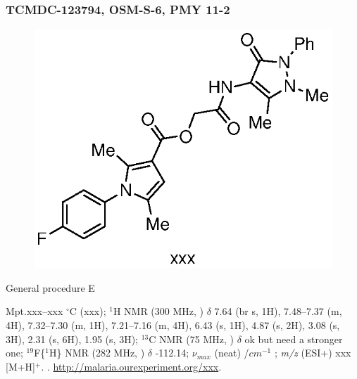\documentclass[12pt, a4paper,titlepage]{article}
\begin{document}
\subsubsection*{TCMDC-123794, OSM-S-6, PMY 11-2}
\label{exp:PMY11}
	\begin{figure}[H]
	\begin{center}
	\includegraphics{exp/PMY11.eps}
	\end{center}
	\vspace{-25pt}	
	\end{figure}	
General procedure E

Mpt.xxx--xxx $^\circ$C (xxx); 
$^1$H NMR (300 MHz, ) $\delta$ 7.64 (br s, 1H), 7.48--7.37 (m, 4H), 7.32--7.30 (m, 1H), 7.21--7.16 (m, 4H), 6.43 (s, 1H), 4.87 (s, 2H), 3.08 (s, 3H), 2.31 (s, 6H), 1.95 (s, 3H); 
  $^{13}$C NMR (75 MHz, ) $\delta$ ok but need a stronger one; 
$^{19}$F\{$^1$H\} NMR (282 MHz, ) $\delta$ -112.14; 
 $\nu_{max}$ (neat) /$cm^{-1}$ ; 
\emph{m/z} (ESI+) xxx [M+H]$^+$.
. 
\url{http://malaria.ourexperiment.org/xxx}. 
\end{document}
